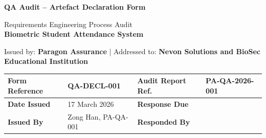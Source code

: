 \documentclass[11pt,a4paper]{article}
\begin{document}
\begin{center}
\LARGE\textbf{QA Audit -- Artefact Declaration Form}

\vspace{0.3cm}
\large Requirements Engineering Process Audit \\
\textbf{Biometric Student Attendance System}

\vspace{0.2cm}
\normalsize
Issued by: \textbf{Paragon Assurance} \quad|\quad
Addressed to: \textbf{Nevon Solutions and BioSec Educational Institution}
\end{center}

\vspace{0.3cm}

\begin{table}[H]
\centering
\small
\renewcommand{\arraystretch}{1.6}
\begin{tabularx}{\textwidth}{|p{}|X|p{}|X|}
\hline
\rowcolor{tableheader}
\textbf{Form Reference} & QA-DECL-001 &
\textbf{Audit Report Ref.} & PA-QA-2026-001 \\
\hline
\textbf{Date Issued} & 17 March 2026 &
\textbf{Response Due} & \underline{\hspace{3cm}} \\
\hline
\textbf{Issued By} & Zong Han, PA-QA-001 &
\textbf{Responded By} & \underline{\hspace{3cm}} \\
\hline
\end{tabularx}
\end{table}

\vspace{0.2cm}
\end{document}
